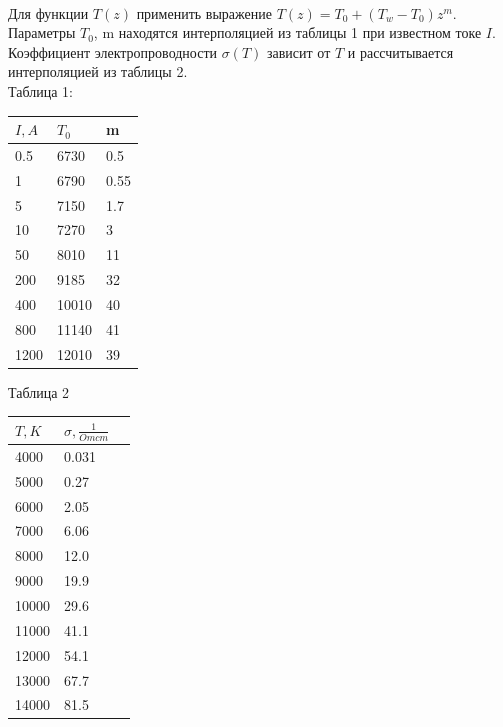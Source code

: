\documentclass[a4paper, 12pt]{article}
\begin{document}
	 \vspace*{1cm} \hspace*{3cm}
	\vspace*{1cm} \\ Для функции $T(z)$ применить выражение $T(z) = T_0 + (T_w - T_0 ) z^m$. 
	\\Параметры  $T_0$, m находятся интерполяцией из таблицы 1 при известном токе $I$.
	\\Коэффициент электропроводности $\sigma(T)$ зависит от $T$ и рассчитывается интерполяцией из  таблицы 2.
	\\Таблица 1:\\
	\vspace*{10mm}\hspace*{40mm}\begin{tabular}{ | l | l | l | }
		\hline
		\textbf{$I, A$}& \textbf{$T_0$} & \textbf{m} \\ \hline
		0.5 & 6730 & 0.5\\ \hline
		1 & 6790 & 0.55\\ \hline
		5 & 7150 & 1.7\\ \hline
		10 & 7270 & 3\\ \hline
		50 & 8010 & 11\\ \hline
		200 & 9185 & 32\\ \hline
		400 & 10010 & 40\\ \hline
		800 & 11140 & 41\\ \hline
		1200 & 12010 & 39\\ \hline
	\end{tabular}
	
\clearpage
\newpage
	Таблица 2\\
	\vspace*{10mm}\hspace*{40mm}\begin{tabular}{ | l | l | l | }
	\hline
	\textbf{$T, K$}& \textbf{$\sigma, \frac{1}{Om cm}$} \\ \hline
	4000 & 0.031 \\ \hline
	5000 & 0.27 \\ \hline
	6000 & 2.05 \\ \hline
	7000 & 6.06 \\ \hline
	8000 & 12.0 \\ \hline
	9000 & 19.9 \\ \hline
	10000 & 29.6 \\ \hline
	11000 & 41.1 \\ \hline
	12000 & 54.1 \\ \hline
	13000 & 67.7 \\ \hline
	14000 & 81.5 \\ \hline
\end{tabular}
\end{document}

